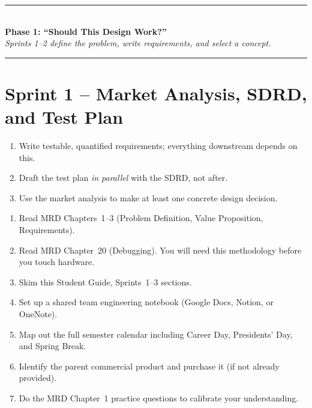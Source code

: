 \begin{center}
\textcolor{minesblue}{\rule{0.6\textwidth}{1pt}}\\[4pt]
{\Large\bfseries\sffamily\color{minesblue} Phase 1: ``Should This Design Work?''}\\[2pt]
{\small\itshape Sprints 1--2 define the problem, write requirements, and select a concept.}\\[4pt]
\textcolor{minesblue}{\rule{0.6\textwidth}{1pt}}
\end{center}
\vspace{0.5em}
\section{Sprint 1 -- Market Analysis, SDRD, and Test Plan}

\begin{priorities}
\begin{enumerate}[leftmargin=*, itemsep=1pt, topsep=0pt]
    \item Write testable, quantified requirements; everything downstream depends on this.
    \item Draft the test plan \textit{in parallel} with the SDRD, not after.
    \item Use the market analysis to make at least one concrete design decision.
\end{enumerate}
\end{priorities}

\begin{checklistbox}
\begin{enumerate}[leftmargin=*, itemsep=1pt, topsep=0pt]
    \item Read MRD Chapters~1--3 (Problem Definition, Value Proposition, Requirements).
    \item Read MRD Chapter~20 (Debugging). You will need this methodology before you touch hardware.
    \item Skim this Student Guide, Sprints~1--3 sections.
    \item Set up a shared team engineering notebook (Google Docs, Notion, or OneNote).
    \item Map out the full semester calendar including Career Day, Presidents' Day, and Spring Break.
    \item Identify the parent commercial product and purchase it (if not already provided).
    \item Do the MRD Chapter~1 practice questions to calibrate your understanding.
\end{enumerate}
\end{checklistbox}

